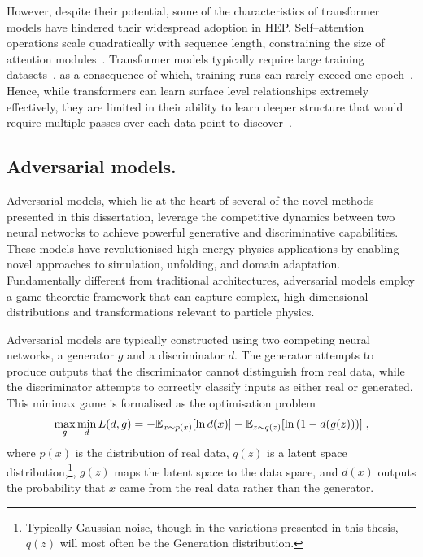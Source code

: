             However, despite their potential, some of the characteristics of transformer models have hindered their widespread adoption in HEP.
            Self--attention operations scale quadratically with sequence length, constraining the size of attention modules~\cite{Vaswani2017AttentionNeed}.
            Transformer models typically require large training datasets~\cite{zhao_large-scale_2024}, as a consequence of which, training runs can rarely exceed one epoch~\cite{miao_locality-sensitive_2024}.
            Hence, while transformers can learn surface level relationships extremely effectively, they are limited in their ability to learn deeper structure that would require multiple passes over each data point to discover~\cite{caron_trackformers_2025, Wang2024InterpretingTagging, stroud_transformers_2024}.
    
    \subsection{Adversarial models.}
    
        Adversarial models, which lie at the heart of several of the novel methods presented in this dissertation, leverage the competitive dynamics between two neural networks to achieve powerful generative and discriminative capabilities.
        These models have revolutionised high energy physics applications by enabling novel approaches to simulation, unfolding, and domain adaptation.
        Fundamentally different from traditional architectures, adversarial models employ a game theoretic framework that can capture complex, high dimensional distributions and transformations relevant to particle physics.
    
        Adversarial models are typically constructed using two competing neural networks, a generator \(g\) and a discriminator \(d\).
        The generator attempts to produce outputs that the discriminator cannot distinguish from real data, while the discriminator attempts to correctly classify inputs as either real or generated.
        This minimax game is formalised as the optimisation problem
        \begin{equation}
            \max_g \min_d L(d, g) = -\mathbb{E}_{x \sim p(x)}[\ln d(x)] - \mathbb{E}_{z \sim q(z)}[\ln\qty(1 - d(g(z)))]\;,
        \end{equation}
        where \(p(x)\) is the distribution of real data, \(q(z)\) is a latent space distribution,\footnote{Typically Gaussian noise, though in the variations presented in this thesis, \(q(z)\) will most often be the Generation distribution.}, \(g(z)\) maps the latent space to the data space, and \(d(x)\) outputs the probability that
        \(x\) came from the real data rather than the generator.
    
